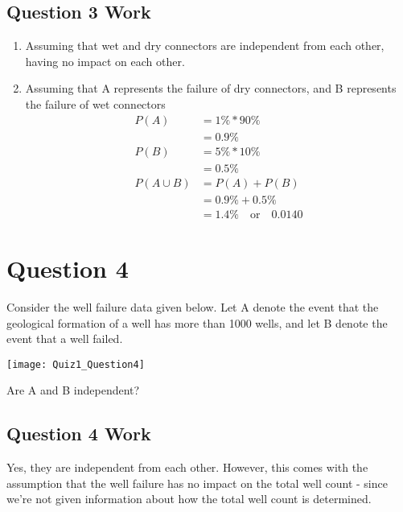 \documentclass[../INDE315_HW.tex]{subfiles}
\begin{document}
\subsection*{Question 3 Work}
\begin{enumerate}
    \item Assuming that wet and dry connectors are independent from each other, having no impact on each other.
    \item Assuming that A represents the failure of dry connectors, and B represents the failure of wet connectors
    \begin{equation*}
        \begin{aligned}
            P(A) &= 1\% * 90\% \\
                &= 0.9\% \\
            P(B) &= 5\% * 10\% \\
                &= 0.5\% \\
            P(A \cup B) &= P(A) + P(B) \\
                &= 0.9\% + 0.5\% \\
                &= 1.4\% \quad \text{or} \quad 0.0140
        \end{aligned}
    \end{equation*}
\end{enumerate}

\section*{Question 4}
Consider the well failure data given below. Let A denote the event that the geological formation of a well has more than 1000 wells, and let B denote the event that a well failed.
\begin{center}
    \texttt{[image: Quiz1\_Question4]}
\end{center}
Are A and B independent?

\subsection*{Question 4 Work}
Yes, they are independent from each other. However, this comes with the assumption that the well failure has no impact on the total well count - since we're not given information about how the total well count is determined.
\end{document}
